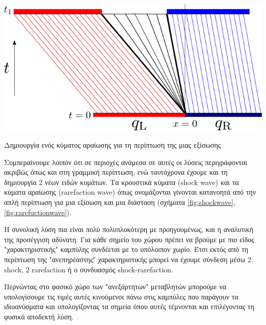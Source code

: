 \begin{marginfigure}
	\centering
	\includegraphics[width=1\linewidth]{Images/rarefuctionwave}
	\caption{Δημιουργία ενός κύματος αραίωσης για τη περίπτωση της μιας εξίσωσης}
	\label{fig:rarefuctionwave}
\end{marginfigure}

Συμπεραίνουμε λοιπόν ότι σε περιοχές ανάμεσα σε αυτές οι λύσεις περιγράφονται ακριβώς όπως και στη γραμμική περίπτωση, ενώ ταυτόχρονα έχουμε και τη δημιουργία 2 νέων ειδών κυμάτων. Τα κρουστικά κύματα (shock wave) και τα κύματα αραίωσης (rarefaction wave) όπως ονομάζονται γίνονται κατανοητά από την απλή περίπτωση για μια εξίσωση και μια διάσταση (σχήματα \ref{fig:shockwave}, \ref{fig:rarefuctionwave}). 

Η συνολική λύση πια είναι πολύ πολυπλοκότερη με προηγουμένως, και η αναλυτική της προσέγγιση αδύνατη. Για κάθε σημείο του χώρου πρέπει να βρούμε με πιο είδος "χαρακτηριστικής" καμπύλης συνδέεται με το υπόλοιπον χωρίο. Έτσι εκτός από τη περίπτωση της "ανεπηρέαστης" χαρακτηριστικής μπορεί να έχουμε σύνδεση μέσω 2 shock, 2 rarefaction ή ο συνδυασμός shock-rarefaction.

Περνώντας στο φασικό χώρο των "ανεξάρτητων" μεταβλητών μπορούμε να υπολογίσουμε τις τιμές αυτές κινούμενοι πάνω στις καμπύλες που παράγουν τα ιδιοανύσματα και υπολογίζοντας τα σημεία όπου αυτές τέμνονται και επιλέγοντας τη φυσικά αποδεκτή λύση.


